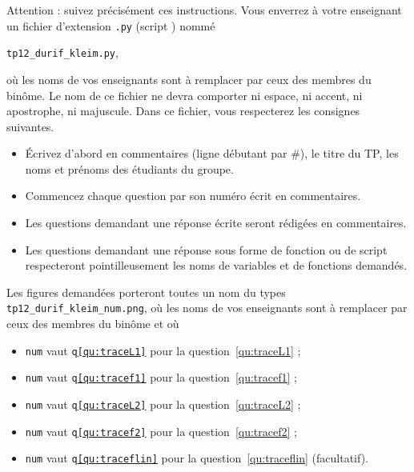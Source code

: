 Attention : suivez précisément ces instructions. Vous enverrez à votre enseignant un fichier d'extension  \texttt{.py} (script \python) nommé
\begin{center}
  \texttt{tp12\_durif\_kleim.py},
\end{center}
où les noms de vos enseignants sont à remplacer par ceux des membres du binôme. Le nom de ce 
fichier ne devra comporter ni espace, ni accent, ni apostrophe, ni majuscule.
Dans ce fichier, vous respecterez les consignes suivantes.
\begin{itemize}
  \item \'Ecrivez d'abord en commentaires (ligne débutant par \#), le titre du TP, les noms et prénoms des étudiants du groupe.
  \item Commencez chaque question par son numéro écrit en commentaires.
  \item Les questions demandant une réponse écrite seront rédigées en commentaires.
  \item Les questions demandant une réponse sous forme de fonction ou de script respecteront pointilleusement les noms de variables et de fonctions demandés.
\end{itemize} 

Les figures demandées porteront toutes un nom du types \texttt{tp12\_durif\_kleim\_num.png}, où les noms de vos enseignants sont à remplacer par ceux des membres du binôme et où
\begin{itemize}
  \item \texttt{num} vaut \texttt{q\ref{qu:traceL1}} pour la question~\ref{qu:traceL1} ;
  \item \texttt{num} vaut \texttt{q\ref{qu:tracef1}} pour la question~\ref{qu:tracef1} ;
  \item \texttt{num} vaut \texttt{q\ref{qu:traceL2}} pour la question~\ref{qu:traceL2} ;
  \item \texttt{num} vaut \texttt{q\ref{qu:tracef2}} pour la question~\ref{qu:tracef2} ;
  \item \texttt{num} vaut \texttt{q\ref{qu:traceflin}} pour la question~\ref{qu:traceflin} (facultatif).
\end{itemize}
